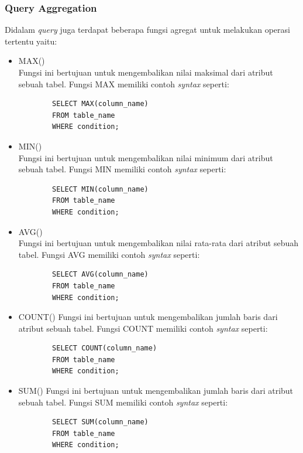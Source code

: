 \subsubsection{Query Aggregation}
Didalam \textit{query} juga terdapat beberapa fungsi agregat untuk melakukan operasi tertentu yaitu:
\begin{itemize}
	\item MAX()\\
	Fungsi ini bertujuan untuk mengembalikan nilai maksimal dari atribut sebuah tabel. Fungsi MAX memiliki contoh \textit{syntax} seperti:
	\begin{verbatim}
		SELECT MAX(column_name)
		FROM table_name
		WHERE condition;
	\end{verbatim}
	
	\item MIN()\\
	Fungsi ini bertujuan untuk mengembalikan nilai minimum dari atribut sebuah tabel. Fungsi MIN memiliki contoh \textit{syntax} seperti:
	\begin{verbatim}
		SELECT MIN(column_name)
		FROM table_name
		WHERE condition;
	\end{verbatim}
	
	\item AVG()\\
	Fungsi ini bertujuan untuk mengembalikan nilai rata-rata dari atribut sebuah tabel. Fungsi AVG memiliki contoh \textit{syntax} seperti:
	\begin{verbatim}
		SELECT AVG(column_name)
		FROM table_name
		WHERE condition;
	\end{verbatim}  
	
	\item COUNT()
	Fungsi ini bertujuan untuk mengembalikan jumlah baris dari atribut sebuah tabel. Fungsi COUNT memiliki contoh \textit{syntax} seperti:
	\begin{verbatim}
		SELECT COUNT(column_name)
		FROM table_name
		WHERE condition;
	\end{verbatim} 
	
	\item SUM()
	Fungsi ini bertujuan untuk mengembalikan jumlah baris dari atribut sebuah tabel. Fungsi SUM memiliki contoh \textit{syntax} seperti:
	\begin{verbatim}
		SELECT SUM(column_name)
		FROM table_name
		WHERE condition;
	\end{verbatim} 
\end{itemize}



